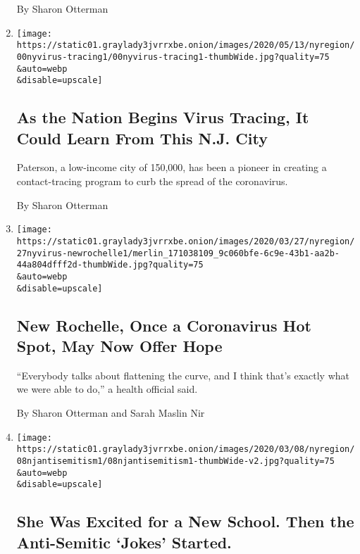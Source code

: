 \begin{enumerate}
  By Sharon Otterman
\item
  \href{/2020/05/21/nyregion/contact-tracing-paterson-nj.html}{}

  \texttt{[image: https://static01.graylady3jvrrxbe.onion/images/2020/05/13/nyregion/00nyvirus-tracing1/00nyvirus-tracing1-thumbWide.jpg?quality=75\\\&auto=webp\\\&disable=upscale]}

  \hypertarget{as-the-nation-begins-virus-tracing-it-could-learn-from-this-nj-city}{%
  \subsection{As the Nation Begins Virus Tracing, It Could Learn From
  This N.J.
  City}\label{as-the-nation-begins-virus-tracing-it-could-learn-from-this-nj-city}}

  Paterson, a low-income city of 150,000, has been a pioneer in creating
  a contact-tracing program to curb the spread of the coronavirus.

  By Sharon Otterman
\item
  \href{/2020/03/27/nyregion/new-rochelle-coronavirus.html}{}

  \texttt{[image: https://static01.graylady3jvrrxbe.onion/images/2020/03/27/nyregion/27nyvirus-newrochelle1/merlin\_171038109\_9c060bfe-6c9e-43b1-aa2b-44a804dfff2d-thumbWide.jpg?quality=75\\\&auto=webp\\\&disable=upscale]}

  \hypertarget{new-rochelle-once-a-coronavirus-hot-spot-may-now-offer-hope}{%
  \subsection{New Rochelle, Once a Coronavirus Hot Spot, May Now Offer
  Hope}\label{new-rochelle-once-a-coronavirus-hot-spot-may-now-offer-hope}}

  ``Everybody talks about flattening the curve, and I think that's
  exactly what we were able to do,'' a health official said.

  By Sharon Otterman and Sarah Maslin Nir
\item
  \href{/2020/03/04/nyregion/new-jersey-antisemitism-high-school.html}{}

  \texttt{[image: https://static01.graylady3jvrrxbe.onion/images/2020/03/08/nyregion/08njantisemitism1/08njantisemitism1-thumbWide-v2.jpg?quality=75\\\&auto=webp\\\&disable=upscale]}

  \hypertarget{she-was-excited-for-a-new-school-then-the-anti-semitic-jokes-started}{%
  \subsection{She Was Excited for a New School. Then the Anti-Semitic
  `Jokes'
  Started.}\label{she-was-excited-for-a-new-school-then-the-anti-semitic-jokes-started}}


\end{enumerate}
